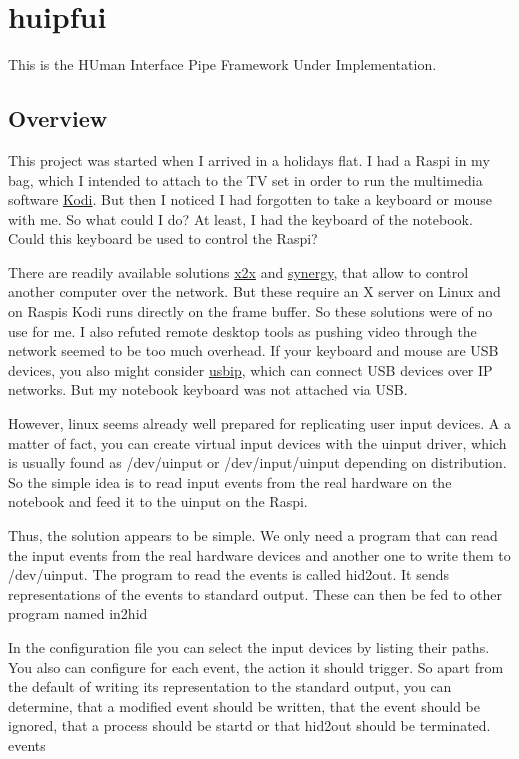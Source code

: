 \section{huipfui}
\label{huipfui}

This is the HUman Interface Pipe Framework Under Implementation.

\subsection{Overview}

This project was started when I arrived in a holidays flat. I had a
Raspi in my bag, which I intended to attach to the TV set in order to run
the multimedia software \href{http://kodi.tv/}{Kodi}. 
But then I noticed I had forgotten to take a keyboard or mouse with me. 
So what could I do? At least, I
had the keyboard of the notebook. Could this keyboard be used to
control the Raspi?

There are readily available solutions 
\href{http://github.com/dottedmag/x2x}{x2x} and 
\href{http://synergy-project.org/}{synergy}, that allow to
control another computer over the network. But these require an X server
on Linux and on Raspis Kodi runs directly on the frame buffer. So these
solutions were of no use for me. I also refuted remote desktop tools as
pushing video through the network seemed to be too much overhead. If your
keyboard and mouse are USB devices, you also might consider 
\href{http://usbip.sourceforge.net/}{usbip}, which
can connect USB devices over IP networks. But my notebook keyboard was
not attached via USB.

However, linux seems already well prepared for replicating 
user input devices. 
A a matter of fact, you can create virtual
input devices with the uinput driver, which is usually found as
/dev/uinput or /dev/input/uinput depending on distribution. So the
simple idea is to read input events from the real hardware on the
notebook and feed it to the uinput on the Raspi.

Thus, the solution appears to be simple.  We only need a program that
can read the input events from the real hardware devices and another
one to write them to /dev/uinput.  The program to read the events is
called hid2out.  It sends representations of the events to standard
output.  These can then be fed to other program named in2hid

In the configuration file you can select the input devices by
listing their paths.
You also can configure for each event, the action it should trigger.
So apart from the default of writing its representation to the 
standard output, you can determine, that a modified event should be written,
that the event should be ignored, that a process should be startd
or that hid2out should be terminated.
events

